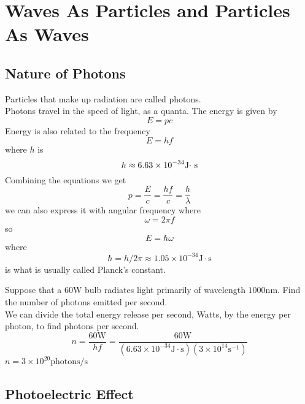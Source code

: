 \chapter{Waves As Particles and Particles As Waves}
\section{Nature of Photons}
Particles that make up radiation are called photons. \\
Photons travel in the speed of light, as a quanta. The energy is given by
\[ E = pc \]
Energy is also related to the frequency
\[ E = hf \]
where $ h $ is 
\[ h \approx 6.63 \times 10^{-34} \mbox{J$ \cdot $ s} \]
Combining the equations we get
\[ p = \frac { E } { c } = \frac { h f } { c } = \frac { h } { \lambda } \]
we can also express it with angular frequency where \[ \omega = 2 \pi f \]
so
\[ E = \hbar \omega \]
where
\[ \hbar = h / 2 \pi \approx 1.05 \times 10 ^ { - 34 } \mathrm { J } \cdot \mathrm { s } \]
is what is usually called Planck's constant. 
\begin{example}
	Suppose that a $ 60 $W bulb radiates light primarily of wavelength $ 1000 $nm. Find the number of photons emitted per second. \\
	We can divide the total energy release per second, Watts, by the energy per photon, to find photons per second.
	\[ n = \frac { 60 \mathrm { W } } { h f } = \frac { 60 \mathrm { W } } { \left( 6.63 \times 10 ^ { - 34 } \mathrm { J } \cdot \mathrm { s } \right) \left( 3 \times 10 ^ { 14 } \mathrm { s } ^ { - 1 } \right) } \]
	$ n  = 3 \times 10 ^ { 20 } \mathrm { photons } / \mathrm { s }$
\end{example}
\section{Photoelectric Effect}
